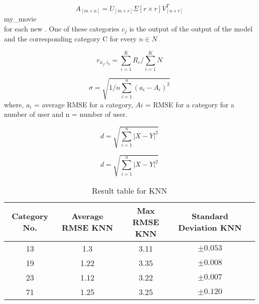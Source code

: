 \documentclass{article}
\begin{document}
\begin{equation}
A_{[m\times n]} = U_{[m \times r]} \Sigma{[r \times r]} V_{[n \times r]}^T 
\label{svd}
\end{equation}
my\_movie\\
for each new  . One of these categories $c_j$ is the output of the output of the model and the corresponding category C for every $ n\in N $


\begin{equation}
r_{n_j,i_b} = \sum_{i=1}^K R_c / \sum_{i=1}^K N
\label{ratingPrediction}
\end{equation}


\begin{equation}
\sigma =\sqrt{1/n \sum_{i=1}^n (a_i - A_i)^2}
\label{stdDev}
\end{equation} 
where, $a_i$ = average RMSE for a category, $Ai$ = RMSE for a category for a number of user and n = number of user. 
                                           
\begin{equation}
d =\sqrt{\sum_{i=1}^n |X-Y|^2}
\label{euclead}
\end{equation}

\begin{equation}
d =\sqrt{\sum_{i=1}^n |X-Y|^2}
\end{equation}

\begin{table}[ht]
	\begin{center}
		\begin{tabular}{ |c|c|c|c|c| } 
			\hline 
			Category No. & Average RMSE KNN & Max RMSE KNN & Standard Deviation KNN \\
			\hline
			13	& 1.3	& 3.11	& $\pm0.053$\\
			19	& 1.22	& 3.35	& $\pm0.008$\\
			23	& 1.12	& 3.22	& $\pm0.007$\\
			71	& 1.25	& 3.25	& $\pm0.120$\\
			
			
			\hline
		\end{tabular}
		\caption{Result table for KNN}
		\label{tableReskn}
	\end{center}
	
\end{table}
\end{document}
